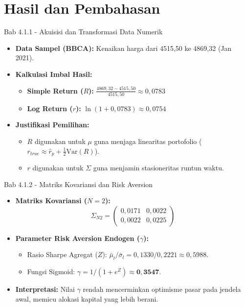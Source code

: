 \section{Hasil dan Pembahasan}

\begin{frame}{Bab 4.1.1 - Akuisisi dan Transformasi Data Numerik}
    \begin{itemize}
        \item \textbf{Data Sampel (BBCA):} Kenaikan harga dari 4515,50 ke 4869,32 (Jan 2021).
        \item \textbf{Kalkulasi Imbal Hasil:}
        \begin{itemize}
            \item \textbf{Simple Return ($R$):} $\frac{4869,32 - 4515,50}{4515,50} \approx 0,0783$
            \item \textbf{Log Return ($r$):} $\ln(1 + 0,0783) \approx 0,0754$
        \end{itemize}
        \item \textbf{Justifikasi Pemilihan:}
        \begin{itemize}
            \item $R$ digunakan untuk $\mu$ guna menjaga linearitas portofolio ($r_{true} \approx \hat{r}_p + \frac{1}{2}\text{Var}(R)$).
            \item $r$ digunakan untuk $\Sigma$ guna menjamin stasioneritas runtun waktu.
        \end{itemize}
    \end{itemize}
\end{frame}

\begin{frame}{Bab 4.1.2 - Matriks Kovariansi dan Risk Aversion}
    \begin{itemize}
        \item \textbf{Matriks Kovariansi ($N=2$):}
        \begin{equation*}
            \Sigma_{N2} = \begin{pmatrix} 0,0171 & 0,0022 \\ 0,0022 & 0,0225 \end{pmatrix}
        \end{equation*}
        \item \textbf{Parameter Risk Aversion Endogen ($\gamma$):}
        \begin{itemize}
            \item Rasio Sharpe Agregat ($Z$): $\bar{\mu}_l / \bar{\sigma}_l = 0,1330 / 0,2221 \approx 0,5988$.
            \item Fungsi Sigmoid: $\gamma = 1 / (1 + e^Z) \approx \mathbf{0,3547}$.
        \end{itemize}
        \item \textbf{Interpretasi:} Nilai $\gamma$ rendah mencerminkan optimisme pasar pada jendela awal, memicu alokasi kapital yang lebih berani.
    \end{itemize}
\end{frame}

